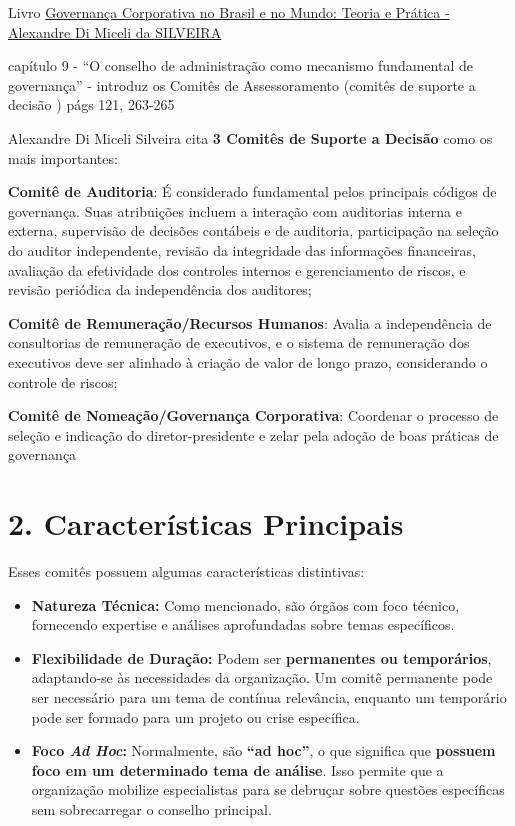 \documentclass[
]{book}
\providecommand{\tightlist}{%
  \setlength{\itemsep}{0pt}\setlength{\parskip}{0pt}}
\begin{document}
Livro \href{https://pdfcoffee.com/governana-corporativa-no-brasil-e-no-mundo-pdf-free.html}{Governança Corporativa no Brasil e no Mundo: Teoria e Prática - Alexandre Di Miceli da SILVEIRA}

capítulo 9 - ``O conselho de administração como mecanismo fundamental de governança'' - introduz os Comitês de Assessoramento (comitês de suporte a decisão ) págs 121, 263-265

Alexandre Di Miceli Silveira cita \textbf{3 Comitês de Suporte a Decisão} como os mais importantes:

\textbf{Comitê de Auditoria}: É considerado fundamental pelos principais códigos de governança. Suas atribuições incluem a interação com auditorias interna e externa, supervisão de decisões contábeis e de auditoria, participação na seleção do auditor independente, revisão da integridade das informações financeiras, avaliação da efetividade dos controles internos e gerenciamento de riscos, e revisão periódica da independência dos auditores;

\textbf{Comitê de Remuneração/Recursos Humanos}: Avalia a independência de consultorias de remuneração de executivos, e o sistema de remuneração dos executivos deve ser alinhado à criação de valor de longo prazo, considerando o controle de riscos;

\textbf{Comitê de Nomeação/Governança Corporativa}: Coordenar o processo de seleção e indicação do diretor-presidente e zelar pela adoção de boas práticas de governança

\section{2. Características Principais}\label{caracteruxedsticas-principais}

Esses comitês possuem algumas características distintivas:

\begin{itemize}
\tightlist
\item
  \textbf{Natureza Técnica:} Como mencionado, são órgãos com foco técnico, fornecendo expertise e análises aprofundadas sobre temas específicos.
\item
  \textbf{Flexibilidade de Duração:} Podem ser \textbf{permanentes ou temporários}, adaptando-se às necessidades da organização. Um comitê permanente pode ser necessário para um tema de contínua relevância, enquanto um temporário pode ser formado para um projeto ou crise específica.
\item
  \textbf{Foco \emph{Ad Hoc}:} Normalmente, são \textbf{``ad hoc''}, o que significa que \textbf{possuem foco em um determinado tema de análise}. Isso permite que a organização mobilize especialistas para se debruçar sobre questões específicas sem sobrecarregar o conselho principal.
\end{itemize}
\end{document}
